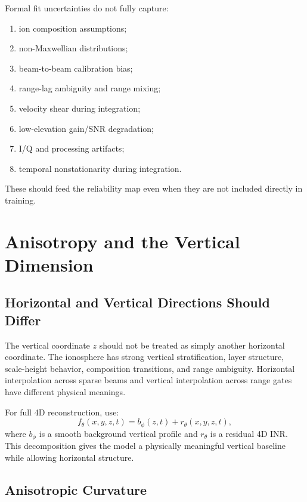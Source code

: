 \documentclass[11pt]{article}
\begin{document}
Formal fit uncertainties do not fully capture:
\begin{enumerate}[leftmargin=*]
  \item ion composition assumptions;
  \item non-Maxwellian distributions;
  \item beam-to-beam calibration bias;
  \item range-lag ambiguity and range mixing;
  \item velocity shear during integration;
  \item low-elevation gain/SNR degradation;
  \item I/Q and processing artifacts;
  \item temporal nonstationarity during integration.
\end{enumerate}
These should feed the reliability map even when they are not included directly in training.

\section{Anisotropy and the Vertical Dimension}

\subsection{Horizontal and Vertical Directions Should Differ}

The vertical coordinate $z$ should not be treated as simply another horizontal coordinate. The
ionosphere has strong vertical stratification, layer structure, scale-height behavior, composition
transitions, and range ambiguity. Horizontal interpolation across sparse beams and vertical
interpolation across range gates have different physical meanings.

For full 4D reconstruction, use:
\begin{equation}
  f_{\theta}(x,y,z,t)
  =
  b_{\phi}(z,t)
  +
  r_{\theta}(x,y,z,t),
\end{equation}
where $b_{\phi}$ is a smooth background vertical profile and $r_{\theta}$ is a residual 4D INR.
This decomposition gives the model a physically meaningful vertical baseline while allowing
horizontal structure.

\subsection{Anisotropic Curvature}
\end{document}
